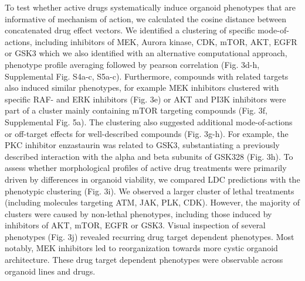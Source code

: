 \begin{flushleft}
To test whether active drugs systematically induce organoid phenotypes that are informative of mechanism of action, we calculated the cosine distance between concatenated drug effect vectors. We identified a clustering of specific mode-of-actions, including inhibitors of MEK, Aurora kinase, CDK, mTOR, AKT, EGFR or GSK3 which we also identified with an alternative computational approach, phenotype profile averaging followed by pearson correlation (Fig. 3d-h, Supplemental Fig. S4a-c, S5a-c). Furthermore, compounds with related targets also induced similar phenotypes, for example MEK inhibitors clustered with specific RAF- and ERK inhibitors (Fig. 3e) or AKT and PI3K inhibitors were part of a cluster mainly containing mTOR targeting compounds (Fig. 3f, Supplemental Fig. 5a). The clustering also suggested additional mode-of-actions or off-target effects for well-described compounds (Fig. 3g-h). For example, the PKC inhibitor enzastaurin was related to GSK3, substantiating a previously described interaction with the alpha and beta subunits of GSK328 (Fig. 3h). To assess whether morphological profiles of active drug treatments were primarily driven by differences in organoid viability, we compared LDC predictions with the phenotypic clustering (Fig. 3i). We observed a larger cluster of lethal treatments (including molecules targeting ATM, JAK, PLK, CDK). However, the majority of clusters were caused by non-lethal phenotypes, including those induced by inhibitors of AKT, mTOR, EGFR or GSK3. Visual inspection of several phenotypes (Fig. 3j) revealed recurring drug target dependent phenotypes. Most notably, MEK inhibitors led to reorganization towards more cystic organoid architecture. These drug target dependent phenotypes were observable across organoid lines and drugs.


\end{flushleft}

